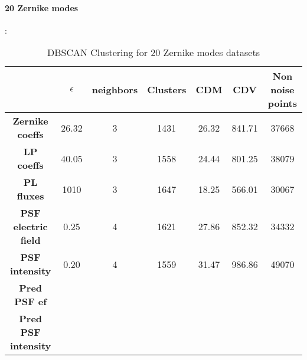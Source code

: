 		\paragraph{20 Zernike modes}:
		\begin{table}[h!]
			\centering
			\begin{tabular}{|c|c|c|c|c|c|c|}
				\hline
				\textbf{} & \textbf{$\epsilon$} & \textbf{neighbors} & \textbf{Clusters} & \textbf{CDM} & \textbf{CDV} & \textbf{Non noise points}\\
				\hline
				\textbf{Zernike coeffs} & 26.32 & 3 & 1431 & 26.32 & 841.71 & 37668 \\
				\hline
				\textbf{LP coeffs} & 40.05 & 3 & 1558 & 24.44 & 801.25 & 38079 \\
				\hline
				\textbf{PL fluxes} & 1010 & 3 & 1647 & 18.25 & 566.01 & 30067 \\
				\hline
				\textbf{PSF electric field} & 0.25 & 4 & 1621 & 27.86 & 852.32 & 34332 \\
				\hline
				\textbf{PSF intensity} & 0.20 & 4 & 1559 & 31.47 & 986.86 & 49070 \\
				\hline
				\textbf{Pred PSF ef} &  &  &  &  &  &  \\
				\hline
				\textbf{Pred PSF intensity} &  &  &  &  &  &  \\
				\hline
			\end{tabular}
		\caption{DBSCAN Clustering for 20 Zernike modes datasets}
		\end{table}
		\FloatBarrier
		
		
	